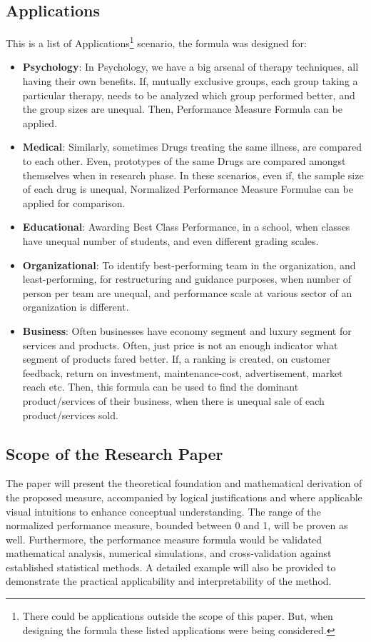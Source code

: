 \documentclass[a4paper,fleqn,review]{cas-sc}
\begin{document}
\subsection{Applications}
This is a list of Applications\footnote{There could be applications outside the scope of this paper. But, when designing the formula these listed applications were being considered.} scenario, the formula was designed for:
\begin{itemize}
	\item \textbf{Psychology}: In Psychology, we have a big arsenal of therapy techniques, all having their own benefits. If, mutually exclusive groups, each group taking a particular therapy, needs to be analyzed which group performed better, and the group sizes are unequal. Then, Performance Measure Formula can be applied.
	\item \textbf{Medical}: Similarly, sometimes Drugs treating the same illness, are compared to each other. Even, prototypes of the same Drugs are compared amongst themselves when in research phase. In these scenarios, even if, the sample size of each drug is unequal, Normalized Performance Measure Formulae can be applied for comparison.
    \item \textbf{Educational}: Awarding Best Class Performance, in a school, when classes have unequal number of students, and even different grading scales.
    \item \textbf{Organizational}: To identify best-performing team in the organization, and least-performing, for restructuring and guidance purposes, when number of person per team are unequal, and performance scale at various sector of an organization is different.
   \item \textbf{Business}: Often businesses have economy segment and luxury segment for services and products. Often, just price is not an enough indicator what segment of products fared better. If, a ranking is created, on customer feedback, return on investment, maintenance-cost, advertisement, market reach etc. Then, this formula can be used to find the dominant product/services of their business, when there is unequal sale of each product/services sold.
\end{itemize}

\subsection{Scope of the Research Paper}
The paper will present the theoretical foundation and mathematical derivation of the proposed measure, accompanied by logical justifications and where applicable visual intuitions to enhance conceptual understanding. The range of the normalized performance measure, bounded between 0 and 1, will be proven as well. Furthermore, the performance measure formula would be validated mathematical analysis, numerical simulations, and cross-validation against established statistical methods. A detailed example will also be provided to demonstrate the practical applicability and interpretability of the method.
\end{document}
